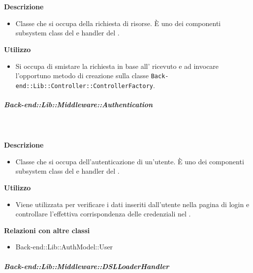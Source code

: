         \textbf{\\ \\ Descrizione} 
          \begin{itemize}
            \item[] Classe che si occupa della richiesta di risorse. È uno dei componenti subsystem class del   e handler del  .
          \end{itemize}      
        \textbf{Utilizzo}  
          \begin{itemize}
            \item[] Si occupa di smistare la richiesta in base all' ricevuto e ad invocare l'opportuno metodo di creazione sulla classe \texttt{Back-end::Lib::Controller::ControllerFactory}.
          \end{itemize}
      \subparagraph{Back-end::Lib::Middleware::Authentication}
        
        \textbf{\\ \\ Descrizione} 
          \begin{itemize}
            \item[] Classe che si occupa dell'autenticazione di un'utente. È uno dei componenti subsystem class del   e handler del  .
          \end{itemize}      
        \textbf{Utilizzo}  
          \begin{itemize}
            \item[] Viene utilizzata per verificare i dati inseriti dall'utente nella pagina di login e controllare l'effettiva corrispondenza delle credenziali nel .
          \end{itemize}
          \textbf{Relazioni con altre classi}
          \begin{itemize}
              \item{Back-end::Lib::AuthModel::User}
          \end{itemize}
      \subparagraph{Back-end::Lib::Middleware::DSLLoaderHandler}
        
